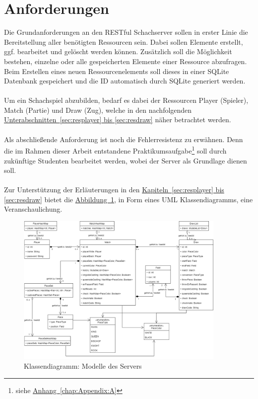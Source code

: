 \section{Anforderungen}\label{sec:anforderungen}
Die Grundanforderungen an den RESTful Schachserver sollen in erster Linie die Bereitstellung aller benötigten Ressourcen sein. Dabei sollen Elemente erstellt, ggf. bearbeitet und gelöscht werden können. Zusätzlich soll die Möglichkeit bestehen, einzelne oder alle gespeicherten Elemente einer Ressource abzufragen. Beim Erstellen eines neuen Ressourcenelements soll dieses in einer SQLite Datenbank gespeichert und die ID automatisch durch SQLite generiert werden.\\
\\
Um ein Schachspiel abzubilden, bedarf es dabei der Ressourcen Player (Spieler), Match (Partie) und Draw (Zug), welche in den nachfolgenden \hyperref[sec:resplayer, sec:resdraw]{Unterabschnitten~\ref{sec:resplayer} bis \ref{sec:resdraw}} näher betrachtet werden.\\
\\
Als abschließende Anforderung ist noch die Fehlerresistenz zu erwähnen. Denn die im Rahmen dieser Arbeit entstandene Praktikumsaufgabe\footnote{siehe \hyperref[chap:Appendix:A]{Anhang~\ref{chap:Appendix:A}}} soll durch zukünftige Studenten bearbeitet werden, wobei der Server als Grundlage dienen soll.\\
\\
Zur Unterstützung der Erläuterungen in den \hyperref[sec:resplayer, sec:resdraw]{Kapiteln~\ref{sec:resplayer} bis \ref{sec:resdraw}} bietet die \hyperref[fig:classdiagram]{Abbildung~\ref{fig:classdiagram}}, in Form eines \gls{UML} Klassendiagramms, eine Veranschaulichung.
\begin{figure}
	\includegraphics[width=0.9\textwidth]{images/classdiagram.png}
	\caption{Klassendiagramm: Modelle des Servers}
	\label{fig:classdiagram}
\end{figure}

